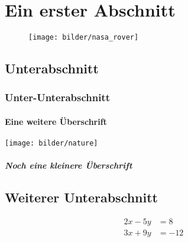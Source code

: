 \documentclass[\hsmasprache]{HMA}
\begin{document}
	
			
	\section{Ein erster Abschnitt}
	
	\thispagestyle{headings}	
	
	
	\blindtext[5]
	
	
	
	\markright{\@\hsmaautor: \@\shorttitle}
	\thispagestyle{headings}
	
	
	
	
	
	
	\begin{figure}[th]
		\centering
		\texttt{[image: bilder/nasa\_rover]}
		\caption{}
		\label{fig:nasarover}
	\end{figure}
	
	\cite{Kornmeier2011}
	\blindtext[4]
	\subsection{Unterabschnitt}
	
	\blindtext[5]
	
	\subsubsection{Unter-Unterabschnitt}
	
	\blindtext[5]
	
	\paragraph{Eine weitere Überschrift}
	
	\begin{figure*}
		\centering
		\texttt{[image: bilder/nature]}
		\caption{}
		\label{fig:nature}
	\end{figure*}
	
	
	\subparagraph{Noch eine kleinere Überschrift}
	
	\subsection{Weiterer Unterabschnitt}
	
	\begin{align*} 
		2x - 5y &=  8 \\ 
		3x + 9y &=  -12
	\end{align*}
	
\end{document}
